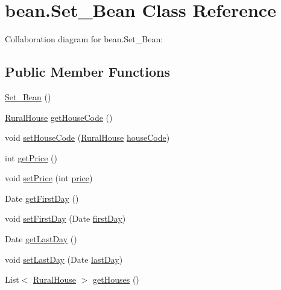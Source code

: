 \hypertarget{classbean_1_1Set__Bean}{}\section{bean.\+Set\+\_\+\+Bean Class Reference}
\label{classbean_1_1Set__Bean}


Collaboration diagram for bean.\+Set\+\_\+\+Bean\+:
\subsection*{Public Member Functions}
\begin{DoxyCompactItemize}
\item 
\mbox{\hyperlink{classbean_1_1Set__Bean_ade7defe328857d39eea0c4b4ca7b7645}{Set\+\_\+\+Bean}} ()
\item 
\mbox{\hyperlink{classdomain_1_1RuralHouse}{Rural\+House}} \mbox{\hyperlink{classbean_1_1Set__Bean_a317933af35c5e82b4ee1dd1883376773}{get\+House\+Code}} ()
\item 
void \mbox{\hyperlink{classbean_1_1Set__Bean_a5b282bcf4e0aeb2283cf610f9a735a5a}{set\+House\+Code}} (\mbox{\hyperlink{classdomain_1_1RuralHouse}{Rural\+House}} \mbox{\hyperlink{classbean_1_1Set__Bean_a80c8bf1baec6aa3305f06e8f34c4905d}{house\+Code}})
\item 
int \mbox{\hyperlink{classbean_1_1Set__Bean_a336e607ada67dc0cbea19914fd8a93b0}{get\+Price}} ()
\item 
void \mbox{\hyperlink{classbean_1_1Set__Bean_aaf052b9a61a529b4934d826791bb8fc8}{set\+Price}} (int \mbox{\hyperlink{classbean_1_1Set__Bean_a667afccf27f2b9861fecfb2f23bf9041}{price}})
\item 
Date \mbox{\hyperlink{classbean_1_1Set__Bean_a623256f1320812316c70b3b9bda4196c}{get\+First\+Day}} ()
\item 
void \mbox{\hyperlink{classbean_1_1Set__Bean_a3e4017a00618c5e33c7479a5a15eb89d}{set\+First\+Day}} (Date \mbox{\hyperlink{classbean_1_1Set__Bean_a5f403451f5e63a57aa62d0ea72fb020b}{first\+Day}})
\item 
Date \mbox{\hyperlink{classbean_1_1Set__Bean_ad9e455b4a923d74204c2d8d3ea4d99cb}{get\+Last\+Day}} ()
\item 
void \mbox{\hyperlink{classbean_1_1Set__Bean_a846f27f98c7eae930bcbbb37c56073d2}{set\+Last\+Day}} (Date \mbox{\hyperlink{classbean_1_1Set__Bean_ab7eaecf178a4ca10c791779a0bf72954}{last\+Day}})
\item 
List$<$ \mbox{\hyperlink{classdomain_1_1RuralHouse}{Rural\+House}} $>$ \mbox{\hyperlink{classbean_1_1Set__Bean_adb0d58588e1704cbc2eeb74ead53175c}{get\+Houses}} ()

\end{DoxyCompactItemize}
